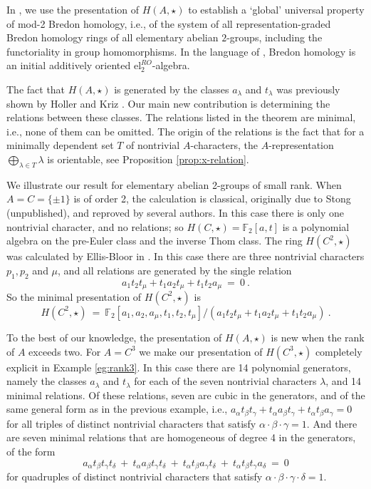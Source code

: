 \documentclass{amsart}[12pt]
\newcommand{\mF}{{\mathbb F}}
\numberwithin{equation}{section}
\theoremstyle{definition}
\begin{document}
In \cite[Theorem 3.5]{hausmann-schwede:bordism}, we use the presentation of
$H(A,\star)$ to establish a `global' universal property of
mod-2 Bredon homology, i.e., of the system of all representation-graded Bredon
homology rings of all elementary abelian $2$-groups, including the functoriality in
group homomorphisms. In the language of \cite{hausmann-schwede:bordism}, Bredon
homology is an initial additively
oriented $\textrm{el}^{R O}_2$-algebra.

The fact that $H(A,\star)$ is generated by the classes $a_\lambda$ and $t_\lambda$
was previously shown by Holler and Kriz \cite{holler-kriz}.
Our main new contribution is determining the relations between these classes.
The relations listed in the theorem are minimal, i.e., none of them can be omitted.
The origin of the relations is the fact that 
for a minimally dependent set $T$ of nontrivial $A$-characters,
the $A$-representation $\bigoplus_{\lambda\in T}\lambda$ is orientable,
see Proposition \ref{prop:x-relation}.

We illustrate our result for elementary abelian 2-groups of small rank.
When $A=C=\{\pm 1\}$ is of order 2, the calculation is classical,
originally due to Stong (unpublished), and reproved by several authors.
In this case there is only one nontrivial character, and no relations;
so $ H(C,\star) =\mF_2[a,t]$ is a polynomial algebra
on the pre-Euler class and the inverse Thom class.
The ring $H(C^2,\star)$ was calculated by Ellis-Bloor in \cite[Theorem 4.14]{ellis-bloor}.
In this case there are three nontrivial characters
$p_1,p_2$ and $\mu$, and all relations are generated by the single relation
\[ a_1 t_2 t_\mu + t_1 a_2 t_\mu + t_1 t_2 a_\mu\ = \ 0\ .\]
So the minimal presentation of $H(C^2,\star)$ is
\[  H(C^2,\star) \ =\ \mF_2[a_1,a_2,a_\mu,t_1,t_2,t_\mu] / (a_1 t_2 t_\mu + t_1 a_2 t_\mu + t_1 t_2 a_\mu)\ .\]


To the best of our knowledge, the presentation of $H(A,\star)$ is new when the rank of $A$
exceeds two.
For $A=C^3$ we make our presentation of $H(C^3,\star)$
completely explicit in Example \ref{eg:rank3}. In this case there are
14 polynomial generators, namely the classes $a_\lambda$ and $t_\lambda$
for each of the seven nontrivial characters $\lambda$, and 14 minimal relations.
Of these relations, seven are cubic in the generators, and of the same general form
as in the previous example, i.e.,
$a_{\alpha} t_{\beta} t_{\gamma} + t_{\alpha} a_{\beta} t_{\gamma} + t_{\alpha} t_{\beta} a_{\gamma}  = 0$
for all triples of distinct nontrivial characters that satisfy  $\alpha\cdot\beta\cdot\gamma=1$.
And there are seven minimal relations that are homogeneous of degree 4 in the generators,
of the form
\[  a_{\alpha} t_{\beta} t_{\gamma} t_\delta\ +\ t_{\alpha} a_{\beta} t_{\gamma} t_\delta \ +\ t_{\alpha} t_{\beta} a_{\gamma}t_\delta\  +\ t_{\alpha} t_{\beta} t_{\gamma}a_\delta \ =\ 0\]
for quadruples of distinct nontrivial characters
that satisfy  $\alpha\cdot\beta\cdot\gamma\cdot\delta=1$.
\end{document}
